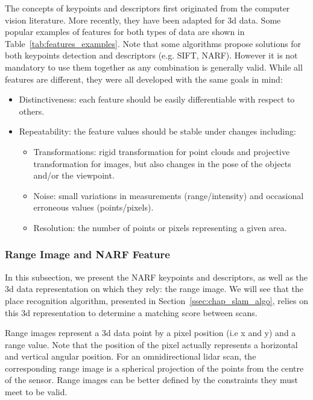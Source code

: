 The concepts of keypoints and descriptors first originated from the computer vision literature. More recently, they have been adapted for \gls*{3d} data. Some popular examples of features for both types of data are shown in Table~\ref{tab:features_examples}. Note that some algorithms propose solutions for both keypoints detection and descriptors (e.g. SIFT, NARF). However it is not mandatory to use them together as any combination is generally valid. While all features are different, they were all developed with the same goals in mind:
\begin{itemize}[label=$\bullet$,noitemsep,topsep=0pt]
    \item Distinctiveness: each feature should be easily differentiable with respect to others.
    \item Repeatability: the feature values should be stable under changes including:
        \begin{itemize}[label=$\circ$,noitemsep,topsep=0pt]
            \item Transformations: rigid transformation for point clouds and projective transformation for images, but also changes in the pose of the objects and/or the viewpoint.
            \item Noise: small variations in measurements (range/intensity) and occasional erroneous values (points/pixels).
            \item Resolution: the number of points or pixels representing a given area.
        \end{itemize}
\end{itemize}


\subsubsection{Range Image and NARF Feature}
\label{ssub:NARF Features and Range Image}

In this subsection, we present the NARF keypoints and descriptors, as well as the \gls*{3d} data representation on which they rely: the range image. We will see that the place recognition algorithm, presented in Section~\ref{ssec:chap_slam_algo}, relies on this \gls*{3d} representation to determine a matching score between scans.

Range images represent a \gls*{3d} data point by a pixel position (i.e x and y) and a range value. Note that the position of the pixel actually represents a horizontal and vertical angular position. For an omnidirectional \gls*{lidar} scan, the corresponding range image is a spherical projection of the points from the centre of the sensor. Range images can be better defined by the constraints they must meet to be valid.


